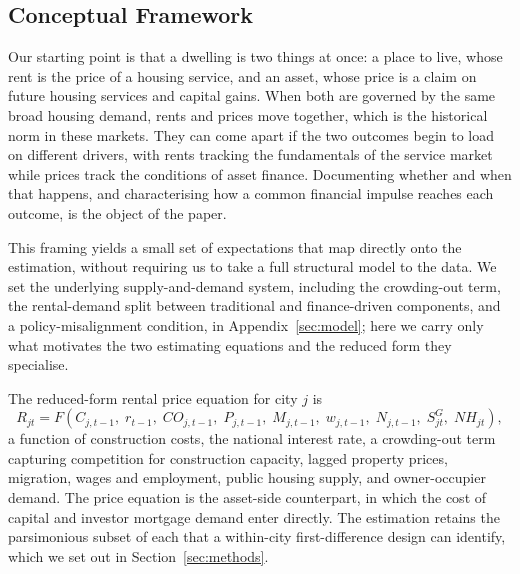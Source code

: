 \documentclass[preprint,11pt,authoryear]{elsarticle}
\begin{document}
\subsection{Conceptual Framework}
\label{sec:theory}

Our starting point is that a dwelling is two things at once: a place to
live, whose rent is the price of a housing service, and an asset, whose
price is a claim on future housing services and capital gains. When both
are governed by the same broad housing demand, rents and prices move
together, which is the historical norm in these markets. They can come
apart if the two outcomes begin to load on different drivers, with rents
tracking the fundamentals of the service market while prices track the
conditions of asset finance. Documenting whether and when that happens,
and characterising how a common financial impulse reaches each outcome,
is the object of the paper.

This framing yields a small set of expectations that map directly onto
the estimation, without requiring us to take a full structural model to
the data. We set the underlying supply-and-demand system, including the
crowding-out term, the rental-demand split between traditional and
finance-driven components, and a policy-misalignment condition, in
Appendix~\ref{sec:model}; here we carry only what motivates the two
estimating equations and the reduced form they specialise.

The reduced-form rental price equation for city $j$ is
\begin{equation}
\label{eq:reduced_regional}
R_{jt} = F(C_{j,t-1},\; r_{t-1},\; CO_{j,t-1},\;
P_{j,t-1},\; M_{j,t-1},\; w_{j,t-1},\;
N_{j,t-1},\; S^G_{jt},\; NH_{jt}),
\end{equation}
a function of construction costs, the national interest rate, a
crowding-out term capturing competition for construction capacity,
lagged property prices, migration, wages and employment, public housing
supply, and owner-occupier demand. The price equation is the asset-side
counterpart, in which the cost of capital and investor mortgage demand
enter directly. The estimation retains the parsimonious subset of each
that a within-city first-difference design can identify, which we set out
in Section~\ref{sec:methods}.
\end{document}
